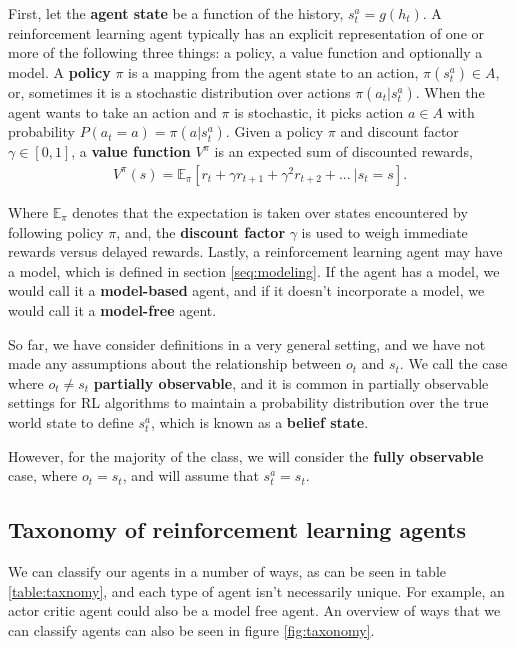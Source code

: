 \documentclass{article}
\newcommand{\E}{\mathbb{E}}                                        %
\begin{document}
First, let the \textbf{agent state} be a function of the history, $s_t^a=g(h_t)$. A reinforcement learning agent typically has an explicit representation of one or more of the following three things: a policy, a value function and optionally a model. A \textbf{policy} $\pi$ is a mapping from the agent state to an action, $\pi(s_t^a) \in A$, or, sometimes it is a stochastic distribution over actions $\pi(a_t | s_t^a)$. When the agent wants to take an action and $\pi$ is stochastic, it picks action $a\in A$ with probability $P(a_t=a) = \pi(a|s_t^a)$. Given a policy $\pi$ and discount factor $\gamma \in [0,1]$, a \textbf{value function} $V^\pi$ is an expected sum of discounted rewards, 
\begin{align}
    V^\pi(s) = \E_\pi[r_t + \gamma r_{t+1} + \gamma^2 r_{t+2} + ...\ | s_t = s ].
\end{align}

Where $\E_\pi$ denotes that the expectation is taken over states encountered by following policy $\pi$, and, the \textbf{discount factor} $\gamma$ is used to weigh immediate rewards versus delayed rewards. Lastly, a reinforcement learning agent may have a model, which is defined in section \ref{seq:modeling}. If the agent has a model, we would call it a \textbf{model-based} agent, and if it doesn't incorporate a model, we would call it a \textbf{model-free} agent. 

So far, we have consider definitions in a very general setting, and we have not made any assumptions about the relationship between $o_t$ and $s_t$. We call the case where $o_t \neq s_t$ \textbf{partially observable}, and it is common in partially observable settings for RL algorithms to maintain a probability distribution over the true world state to define $s^a_t$, which is known as a \textbf{belief state}. 

However, for the majority of the class, we will consider the \textbf{fully observable} case, where $o_t=s_t$, and will assume that $s_t^a = s_t$. 



\subsection{Taxonomy of reinforcement learning agents}

We can classify our agents in a number of ways, as can be seen in table \ref{table:taxnomy}, and each type of agent isn't necessarily unique. For example, an actor critic agent could also be a model free agent. An overview of ways that we can classify agents can also be seen in figure \ref{fig:taxonomy}.
\end{document}
